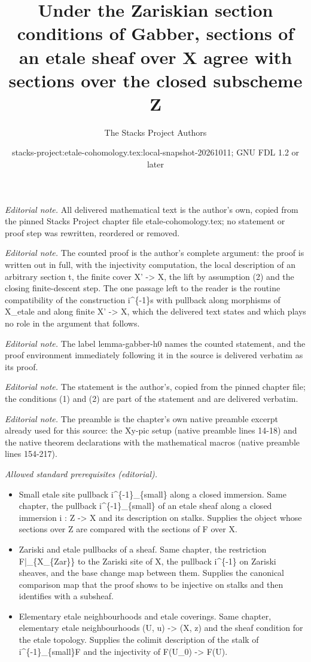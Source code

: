 \documentclass[10pt,a4paper]{amsart}
\title{Under the Zariskian section conditions of Gabber, sections of an etale sheaf over X agree with sections over the closed subscheme Z}
\author{The Stacks Project Authors}
\date{stacks-project:etale-cohomology.tex:local-snapshot-20261011; GNU FDL 1.2 or later}
\theoremstyle{plain}
\theoremstyle{definition}
\theoremstyle{remark}
\numberwithin{equation}{subsection}
\begin{document}
\maketitle
\noindent\textit{Editorial note.} All delivered mathematical text is the author's own, copied from the pinned Stacks Project chapter file etale-cohomology.tex; no statement or proof step was rewritten, reordered or removed.\par\medskip
\noindent\textit{Editorial note.} The counted proof is the author's complete argument: the proof is written out in full, with the injectivity computation, the local description of an arbitrary section t, the finite cover X' -> X, the lift by assumption (2) and the closing finite-descent step. The one passage left to the reader is the routine compatibility of the construction i\textasciicircum{}\{-1\}s with pullback along morphisms of X\_etale and along finite X' -> X, which the delivered text states and which plays no role in the argument that follows.\par\medskip
\noindent\textit{Editorial note.} The label lemma-gabber-h0 names the counted statement, and the proof environment immediately following it in the source is delivered verbatim as its proof.\par\medskip
\noindent\textit{Editorial note.} The statement is the author's, copied from the pinned chapter file; the conditions (1) and (2) are part of the statement and are delivered verbatim.\par\medskip
\noindent\textit{Editorial note.} The preamble is the chapter's own native preamble excerpt already used for this source: the Xy-pic setup (native preamble lines 14-18) and the native theorem declarations with the mathematical macros (native preamble lines 154-217).\par\medskip
\noindent\textit{Allowed standard prerequisites (editorial).}\begin{itemize}
\item Small etale site pullback i\textasciicircum{}\{-1\}\_\{small\} along a closed immersion. Same chapter, the pullback i\textasciicircum{}\{-1\}\_\{small\} of an etale sheaf along a closed immersion i : Z -> X and its description on stalks. Supplies the object whose sections over Z are compared with the sections of F over X.
\item Zariski and etale pullbacks of a sheaf. Same chapter, the restriction F|\_\{X\_\{Zar\}\} to the Zariski site of X, the pullback i\textasciicircum{}\{-1\} on Zariski sheaves, and the base change map between them. Supplies the canonical comparison map that the proof shows to be injective on stalks and then identifies with a subsheaf.
\item Elementary etale neighbourhoods and etale coverings. Same chapter, elementary etale neighbourhoods (U, u) -> (X, z) and the sheaf condition for the etale topology. Supplies the colimit description of the stalk of i\textasciicircum{}\{-1\}\_\{small\}F and the injectivity of F(U\_0) -> F(U).
\end{itemize}\medskip
\end{document}
